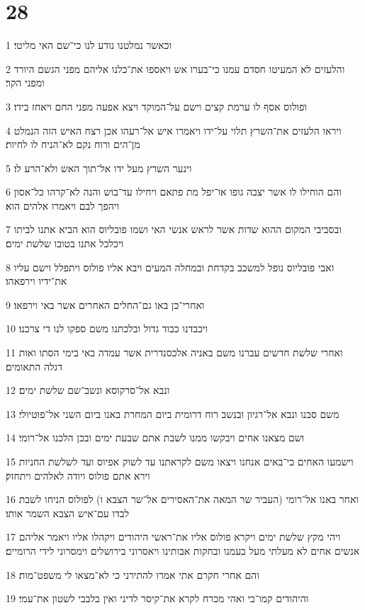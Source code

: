 \chapter{28}

\par 1 וכאשר נמלטנו נודע לנו כי־שם האי מליטי׃
\par 2 והלעזים לא המעיטו חסדם עמנו כי־בערו אש ויאספו את־כלנו אליהם מפני הגשם היורד ומפני הקר׃
\par 3 ופולוס אסף לו ערמת קצים וישם על־המוקד ויצא אפעה מפני החם ויאחז בידו׃
\par 4 ויראו הלעזים את־השרץ תלוי על־ידו ויאמרו איש אל־רעהו אכן רצח האיש הזה הנמלט מן־הים ורוח נקם לא־הניח לו לחיות׃
\par 5 וינער השרץ מעל ידו אל־תוך האש ולא־הרע לו׃
\par 6 והם הוחילו לו אשר יצבה גופו או־יפל מת פתאם ויחילו עד־בוש והנה לא־קרהו כל־אסון ויהפך לבם ויאמרו אלהים הוא׃
\par 7 ובסביבי המקום ההוא שדות אשר לראש אנשי האי ושמו פובליוס הוא הביא אתנו לביתו ויכלכל אתנו בטובו שלשת ימים׃
\par 8 ואבי פובליוס נופל למשכב בקדחת ובמחלה המעים ויבא אליו פולוס ויתפלל וישם עליו את־ידיו וירפאהו׃
\par 9 ואחרי־כן באו גם־החלים האחרים אשר באי וירפאו׃
\par 10 ויכבדנו כבוד גדול ובלכתנו משם ספקו לנו די צרכנו׃
\par 11 ואחרי שלשת חדשים עברנו משם באניה אלכסנדרית אשר עמדה באי בימי הסתו ואות דגלה התאומים׃
\par 12 ונבא אל־סרקוסא ונשב־שם שלשת ימים׃
\par 13 משם סבנו ונבא אל־רגיון ובנשב רוח דרומית ביום המחרת באנו ביום השני אל־פוטיולי׃
\par 14 ושם מצאנו אחים ויבקשו ממנו לשבת אתם שבעת ימים ובכן הלכנו אל־רומי׃
\par 15 וישמעו האחים כי־באים אנחנו ויצאו משם לקראתנו עד לשוק אפיוס ועד לשלשת החניות וירא אתם פולוס ויודה לאלהים ויתחזק׃
\par 16 ואחר באנו אל־רומי (העביר שר המאה את־האסירים אל־שר הצבא ו) לפולוס הניחו לשבת לבדו עם־איש הצבא השמר אותו׃
\par 17 ויהי מקץ שלשת ימים ויקרא פולוס אליו את־ראשי היהודים ויקהלו אליו ויאמר אליהם אנשים אחים לא מעלתי מעל בעמנו ובחקות אבותינו ויאסרוני בירושלים וימסרוני לידי הרומיים׃
\par 18 והם אחרי חקרם אתי אמרו להתירני כי לא־מצאו לי משפט־מות׃
\par 19 והיהודים קמו־בי ואהי מכרח לקרא את־קיסר לדיני ואין בלבבי לשטון את־עמי׃
